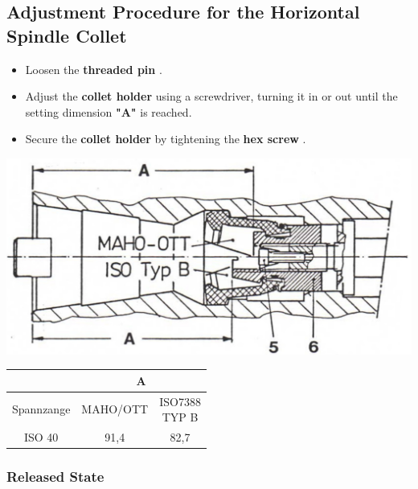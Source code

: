 
\newpage

\subsection*{Adjustment Procedure for the Horizontal Spindle Collet}

\begin{itemize}
    \item Loosen the \textbf{threaded pin }.
    \item Adjust the \textbf{collet holder } using a screwdriver, turning it in or out until the setting dimension \textbf{"A"} is reached.
    \item Secure the \textbf{collet holder } by tightening the \textbf{hex screw }.
\end{itemize}

\begin{minipage}{0.5\textwidth}
    \centering
    \includegraphics[width=\textwidth]{images/chapter7/collet_adjustment_horizontal.jpg}
\end{minipage}
\hfill
\begin{minipage}{0.5\textwidth}
    \centering
    \renewcommand{\arraystretch}{1.5} %
    \begin{tabular}{|c|c|c|}
        \hline
        & \multicolumn{2}{c|}{A} \\ \hline
        Spannzange & MAHO/OTT & \shortstack{\rule{0pt}{1.2em} ISO7388 \\ TYP B} \\ \hline
        ISO 40 & 91,4 & 82,7 \\ \hline
    \end{tabular}
\end{minipage}

\subsubsection*{Released State}

